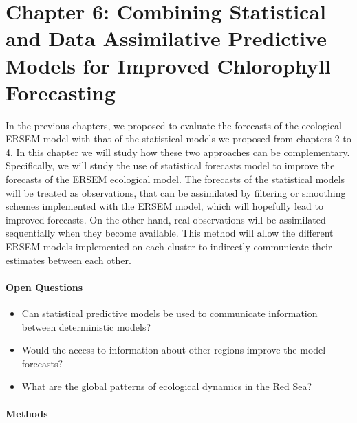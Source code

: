 \section{Chapter 6: Combining Statistical and Data Assimilative Predictive
Models for Improved Chlorophyll Forecasting}

In the previous chapters, we proposed to evaluate the forecasts of the
ecological ERSEM model with that of the statistical models we proposed from
chapters 2 to 4. In this chapter we will study how these two approaches can be
complementary. Specifically, we will study the use of statistical forecasts
model to improve the forecasts of the ERSEM ecological model. The forecasts of
the statistical models will be treated as observations, that can be assimilated
by filtering or smoothing schemes implemented with the ERSEM model, which will
hopefully lead to improved forecasts. On the other hand, real observations will
be assimilated sequentially when they become available. This method will allow
the different ERSEM models implemented on each cluster to indirectly
communicate their estimates between each other.

\paragraph{Open Questions}

\begin{itemize}

\item Can statistical predictive models be used to communicate information
between deterministic models?

\item Would the access to information about other regions improve the model
forecasts?

\item What are the global patterns of ecological dynamics in the Red Sea?

\end{itemize}

\paragraph{Methods}

